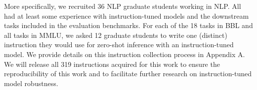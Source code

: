 
More specifically, we recruited 36 NLP graduate students working in NLP.
All had at least some experience with instruction-tuned models and the downstream tasks included in the evaluation benchmarks.
For each of the 18 tasks in \textsc{BBL} and all tasks in \textsc{MMLU}, we asked 12 graduate students to write one (distinct) instruction they would use for zero-shot inference with an instruction-tuned model.
We provide details on this instruction collection process in Appendix A.
We will release all 319 instructions acquired for this work to ensure the reproducibility of this work and to facilitate further research on instruction-tuned model robustness.









